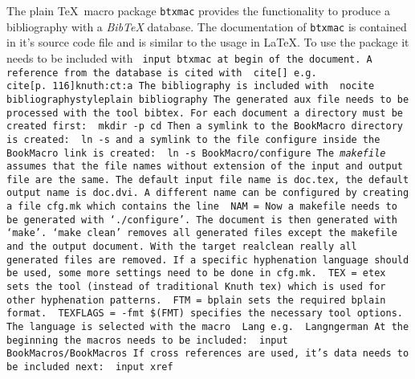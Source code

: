 The plain \TeX\ macro package {\tt btxmac} provides the functionality
to produce a bibliography with a {\sl BibTeX} database.
The documentation of {\tt btxmac} is contained in it's source
code file and is similar to the usage in \LaTeX.
To use the package it needs to be included with
\BeginDisp\tt
\RS input btxmac
\End
at begin of the document.
A reference from the database is cited with
\BeginDisp\tt
\RS cite[]\lC{}\rC
\End
e.\thinspace g.
\BeginDisp\tt
\RS cite[p.\ 116]\lC knuth:ct:a\rC
\End
The bibliography is included with
\BeginDisp\tt
\RS nocite\lC *\rC
\RS bibliographystyle\lC plain\rC
\RS bibliography\lC{}\rC
\End
The generated {\tt aux} file needs to be processed
with the tool {\tt bibtex}.
%
For each document a directory must be created first:
\BeginDisp\tt
mkdir -p 
cd 
\End
Then a symlink to the BookMacro directory is created:
\BeginDisp\tt
ln -s 
\End
and a symlink to the file {\tt configure} inside the {\tt BookMacro}
link is created:
\BeginDisp\tt
ln -s BookMacro/configure
\End
The {\sl makefile} assumes that the file names without extension of the input
and output file are the same.
The default input file name is {\tt doc.tex}, the default output name
is {\tt doc.dvi}.
A different name can be configured by creating a file {\tt cfg.mk}
which contains the line
\BeginDisp\tt
NAM = 
\End
Now a makefile needs to be generated with `{\tt./configure}'.
The document is then generated with `{\tt make}'.
`{\tt make clean}' removes all generated files except the makefile and
the output document.
With the target {\tt realclean}
really all generated files are removed.
\medskip\noindent
If a specific hyphenation language should be used,
some more settings need to be done in {\tt cfg.mk}.
\BeginDisp\tt
TEX = etex
\End
sets the tool (instead of traditional Knuth {\tt tex})
which is used for other hyphenation patterns.
\BeginDisp\tt
FTM = bplain
\End
sets the required {\tt bplain} format.
\BeginDisp\tt
TEXFLAGS = -fmt \$(FMT)
\End
specifies the necessary tool options.
\medskip\noindent
The language is selected with the macro
\BeginDisp\tt
\RS Lang\lC{}\rC
\End
e.\thinspace g.
\BeginDisp\tt
\RS Lang\lC ngerman\rC
\End
{}%
At the beginning the macros needs to be included:
\BeginDisp\tt
\RS input BookMacros/BookMacros
\End
If cross references are used, it's data needs to be included next:
\BeginDisp\tt
\RS input xref
\End
